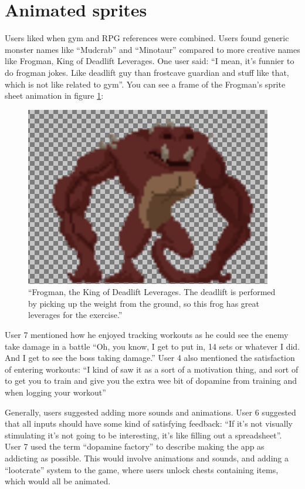 \documentclass{l4proj}
\begin{document}
\section{Animated sprites}
Users liked when gym and RPG references were combined. Users found generic monster names like ``Mudcrab'' and ``Minotaur'' compared to more creative names like Frogman, King of Deadlift Leverages. One user said: ``I mean, it's funnier to do frogman jokes. Like deadlift guy than frostcave guardian and stuff like that, which is not like related to gym''. You can see a frame of the Frogman's sprite sheet animation in figure \ref{fig:frogman}:

\begin{figure}[H]
    \centering
    \includegraphics[width=1.0\linewidth]{froggie.png}    
    \caption{
      ``Frogman, the King of Deadlift Leverages. The deadlift is performed by picking up the weight from the ground, so this frog has great leverages for the exercise.''
    }
    \label{fig:frogman} 
\end{figure}

User 7 mentioned how he enjoyed tracking workouts as he could see the enemy take damage in a battle ``Oh, you know, I get to put in, 14 sets or whatever I did. And I get to see the boss taking damage.'' User 4 also mentioned the satisfaction of entering workouts: ``I kind of saw it as a sort of a motivation thing, and sort of to get you to train and give you the extra wee bit of dopamine from training and when logging your workout''

Generally, users suggested adding more sounds and animations. User 6 suggested that all inputs should have some kind of satisfying feedback: ``If it's not visually stimulating it's not going to be interesting, it's like filling out a spreadsheet''. User 7 used the term ``dopamine factory'' to describe making the app as addicting as possible. This would involve animations and sounds, and adding a ``lootcrate'' system to the game, where users unlock chests containing items, which would all be animated. 
\end{document}
